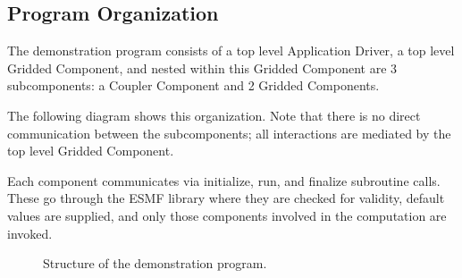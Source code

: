 \subsection{Program Organization}

The demonstration program consists of a top level Application
Driver, a top level Gridded Component, and nested within this Gridded
Component are 3 subcomponents: a Coupler Component and 2 Gridded Components.

The following diagram shows this organization.  Note that there
is no direct communication between the subcomponents; all
interactions are mediated by the top level Gridded Component.

Each component communicates via initialize, run, and finalize
subroutine calls.  These go through the ESMF library where
they are checked for validity, default values are supplied,
and only those components involved in the computation are
invoked.


\begin{figure}[bpht]
\caption[Components]{Structure of the demonstration program.}
\label{fig:democomps}
\begin{center}
\end{center}
\end{figure}


